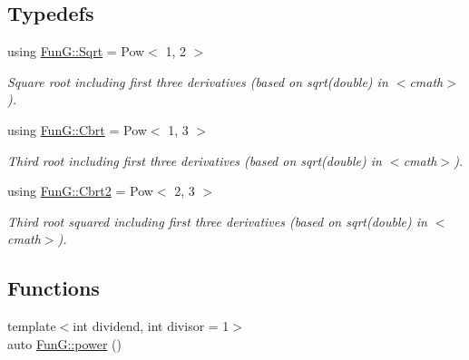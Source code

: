 \subsection*{Typedefs}
\begin{DoxyCompactItemize}
\item 
\hypertarget{group__CMathGroup_gaca80e773d5886f47cd49dc19b130263f}{using \hyperlink{group__CMathGroup_gaca80e773d5886f47cd49dc19b130263f}{Fun\-G\-::\-Sqrt} = Pow$<$ 1, 2 $>$}\label{group__CMathGroup_gaca80e773d5886f47cd49dc19b130263f}

\begin{DoxyCompactList}\small\item\em Square root including first three derivatives (based on sqrt(double) in $<$cmath$>$). \end{DoxyCompactList}\item 
\hypertarget{group__CMathGroup_ga2e4363ad8400e1c8431c10de2152ec2b}{using \hyperlink{group__CMathGroup_ga2e4363ad8400e1c8431c10de2152ec2b}{Fun\-G\-::\-Cbrt} = Pow$<$ 1, 3 $>$}\label{group__CMathGroup_ga2e4363ad8400e1c8431c10de2152ec2b}

\begin{DoxyCompactList}\small\item\em Third root including first three derivatives (based on sqrt(double) in $<$cmath$>$). \end{DoxyCompactList}\item 
\hypertarget{group__CMathGroup_ga9bcbef859d7ffd0d6570d69e1bd8503a}{using \hyperlink{group__CMathGroup_ga9bcbef859d7ffd0d6570d69e1bd8503a}{Fun\-G\-::\-Cbrt2} = Pow$<$ 2, 3 $>$}\label{group__CMathGroup_ga9bcbef859d7ffd0d6570d69e1bd8503a}

\begin{DoxyCompactList}\small\item\em Third root squared including first three derivatives (based on sqrt(double) in $<$cmath$>$). \end{DoxyCompactList}\end{DoxyCompactItemize}
\subsection*{Functions}
\begin{DoxyCompactItemize}
\item 
{\footnotesize template$<$int dividend, int divisor = 1$>$ }\\auto \hyperlink{group__CMathGroup_ga2e83be0dc26bc65453de63fa9e9b55cd}{Fun\-G\-::power} ()
\end{DoxyCompactItemize}


